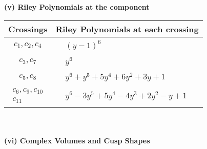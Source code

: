 \documentclass[1p]{elsarticle_modified}
\theoremstyle{definition}
\begin{document}
\newpage\renewcommand{\arraystretch}{1}
\flushleft \textbf{(v) Riley Polynomials at the component}\newline \\
\begin{tabular}{m{50pt}|m{274pt}}
Crossings & \hspace{64pt}Riley Polynomials at each crossing \\
\hline $$\begin{aligned}c_{1},c_{2},c_{4}\end{aligned}$$&$\begin{aligned}
&(y-1)^6
\end{aligned}$\\
\hline $$\begin{aligned}c_{3},c_{7}\end{aligned}$$&$\begin{aligned}
&y^6
\end{aligned}$\\
\hline $$\begin{aligned}c_{5},c_{8}\end{aligned}$$&$\begin{aligned}
&y^6+y^5+5 y^4+6 y^2+3 y+1
\end{aligned}$\\
\hline $$\begin{aligned}c_{6},c_{9},c_{10}\\c_{11}\end{aligned}$$&$\begin{aligned}
&y^6-3 y^5+5 y^4-4 y^3+2 y^2- y+1
\end{aligned}$\\
\hline
\end{tabular}\\~\\
\newpage\flushleft \textbf{(vi) Complex Volumes and Cusp Shapes}
\end{document}
